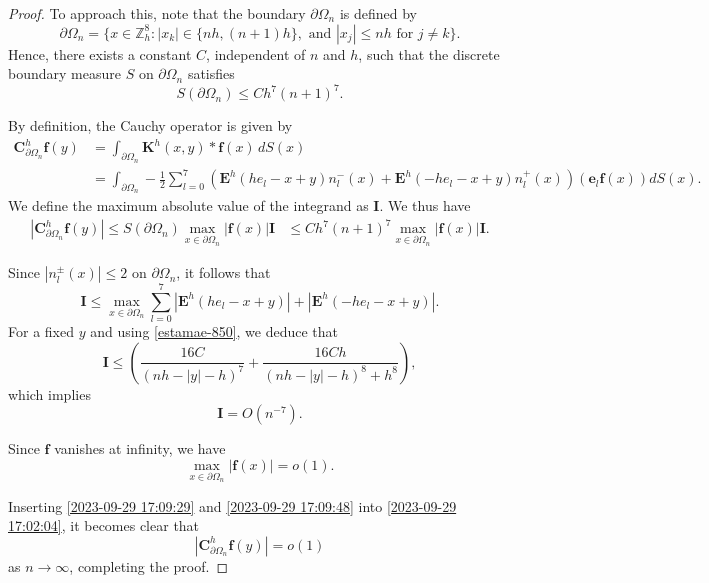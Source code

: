 \documentclass{amsart}
\theoremstyle{definition}
\theoremstyle{remark}
\numberwithin{equation}{section}
\newcommand{\p}{\partial}
\newcommand{\Z}{\mathbb Z}
\newcommand{\f}{\bm{f}}
\newcommand{\e}{\bm{e}}
\newcommand{\E}{\bm{E}}
\begin{document}
\begin{proof}
	To approach this, note that the boundary $\p \Omega_n$ is defined by
	\[
	\p \Omega_n = \{x \in \Z^8_h : |x_k| \in \{nh, (n+1)h\}, \text{ and } |x_j| \leqslant nh \text{ for } j \neq k\}.
	\]
	Hence, there exists a constant $C$,  independent of $n$ and $h$, such that the discrete boundary measure $S$ on $\p \Omega_n$ satisfies
	\[
	S(\p \Omega_n) \leqslant Ch^7(n+1)^7.
	\]
	
	By  definition, the Cauchy operator is given by
	\begin{align*}
		\bm C^h_{\p \Omega_n} \f(y) &= \int_{\p \Omega_n} \bm K^h(x,y) * \f(x) \, dS(x) \\
		&= \int_{\p \Omega_n} -\frac{1}{2} \sum_{l=0}^7 \left(\E^h(he_l-x+y) n_l^-(x) + \E^h(-he_l-x+y) n_l^+(x) \right) (\e_l \f(x)) dS(x).
	\end{align*}
We define the maximum absolute value of the integrand as $\bm I$.
	  We thus have \begin{equation}\label{2023-09-29 17:02:04}
		\begin{aligned}
			|\bm C^h_{\p \Omega_n}\f (y)| \leqslant S(\p \Omega_n) \max_{x\in \p \Omega_n} |\f(x)|  \bm I &\leqslant Ch^7 (n+1)^7 \max_{x\in \p \Omega_n} |\f(x)|  \bm I.
		\end{aligned}
	\end{equation}
	
	
Since $|n_l^{\pm}(x)|\le 2$ on $\p \Omega_n$, it follows that
	\[
	\bm I \leqslant \max_{x \in \p \Omega_n} \sum_{l=0}^7 |\E^h(he_l-x+y)| + |\E^h(-he_l-x+y)|.
	\]
	For a fixed $y$ and using \eqref{estamae-850}, we deduce that
	\[
	\bm I \leqslant \left( \frac{16C}{(nh-|y|-h)^7} + \frac{16Ch}{(nh-|y|-h)^8+h^8} \right),
	\]
	which implies
	\begin{equation}\label{2023-09-29 17:09:29}
	  \bm I = O(n^{-7}).
	\end{equation}
	
	Since $\f$ vanishes at infinity, we have
	\begin{equation}\label{2023-09-29 17:09:48}
		\max_{x \in \p \Omega_n} |\f(x)| = o(1).
	\end{equation}
	
	Inserting \eqref{2023-09-29 17:09:29} and \eqref{2023-09-29 17:09:48} into \eqref{2023-09-29 17:02:04}, it becomes clear that
	\[
	|\bm C^h_{\p \Omega_n}\f(y)| = o(1)
	\]
	as $n \to \infty$, completing the proof.	
\end{proof}
\end{document}
